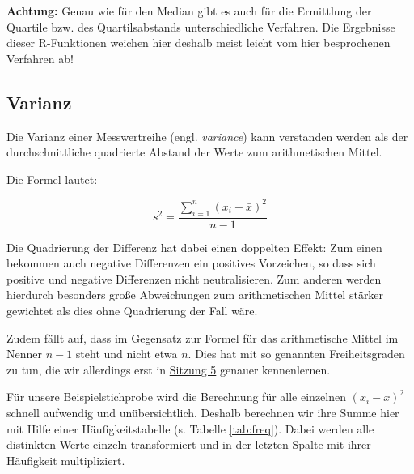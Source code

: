\documentclass[
  11pt,
  ngerman,
  a4paper,
]{report}
\begin{document}
\textbf{Achtung:} Genau wie für den Median gibt es auch für die Ermittlung der Quartile bzw. des Quartilsabstands unterschiedliche Verfahren. Die Ergebnisse dieser R-Funktionen weichen hier deshalb meist leicht vom hier besprochenen Verfahren ab!

\hypertarget{varianz}{%
\subsection{Varianz}\label{varianz}}

Die Varianz einer Messwertreihe (engl. \emph{variance}) kann verstanden werden als der durchschnittliche quadrierte Abstand der Werte zum arithmetischen Mittel.

Die Formel lautet:

\[
  s^2=\frac{\sum\limits_{i=1}^{n}(x_{i}-\bar{x})^2}{n-1}
  \label{eq:var}
\]

Die Quadrierung der Differenz hat dabei einen doppelten Effekt: Zum einen bekommen auch negative Differenzen ein positives Vorzeichen, so dass sich positive und negative Differenzen nicht neutralisieren. Zum anderen werden hierdurch besonders große Abweichungen zum arithmetischen Mittel stärker gewichtet als dies ohne Quadrierung der Fall wäre.

Zudem fällt auf, dass im Gegensatz zur Formel für das arithmetische Mittel im Nenner \(n-1\) steht und nicht etwa \(n\). Dies hat mit so genannten Freiheitsgraden zu tun, die wir allerdings erst in \protect\hyperlink{freiheitsgrade}{Sitzung 5} genauer kennenlernen.

Für unsere Beispielstichprobe wird die Berechnung für alle einzelnen \((x_i-\bar{x})^2\) schnell aufwendig und unübersichtlich. Deshalb berechnen wir ihre Summe hier mit Hilfe einer Häufigkeitstabelle (s. Tabelle \ref{tab:freq}). Dabei werden alle distinkten Werte einzeln transformiert und in der letzten Spalte mit ihrer Häufigkeit multipliziert.
\end{document}
